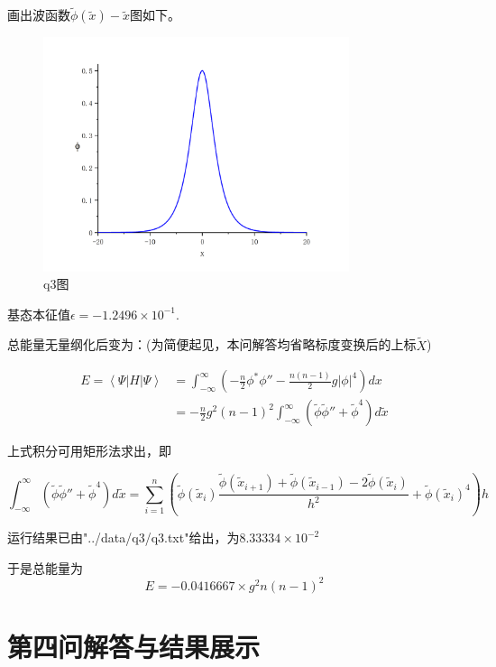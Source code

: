 \documentclass[10pt, a4paper]{article}
\begin{document}
    画出波函数$\tilde{\phi}(\tilde{x})-\tilde{x}$图如下。

    \begin{figure}[H]
        \centering
        \includegraphics[width=0.8\textwidth]{q3图.jpg}
        \caption{q3图}\label{fig:q3图}
    \end{figure}

    基态本征值$\epsilon=-1.2496\times10^{-1}$.

    总能量无量纲化后变为：(为简便起见，本问解答均省略标度变换后的上标$\tilde X$)

    \begin{align*}
      E=\left\langle \varPsi |H|\varPsi \right\rangle
      &=\int_{-\infty}^\infty(-\frac{n}{2}\phi^*\phi''-\frac{n(n-1)}{2}g|\phi|^4)dx\\
      &=-\frac{n}{2}g^2(n-1)^2\int_{-\infty}^\infty(\tilde{\phi}\tilde{\phi}''+\tilde{\phi}^4)d\tilde{x}
    \end{align*}

    上式积分可用矩形法求出，即

    \[\int_{-\infty}^\infty(\tilde{\phi}\tilde{\phi}''+\tilde{\phi}^4)d\tilde{x}=\sum_{i=1}^n(\tilde{\phi}(\tilde{x}_i)\frac{\tilde{\phi}(\tilde{x}_{i+1})+\tilde{\phi}(\tilde{x}_{i-1})-2\tilde{\phi}(\tilde{x}_i)}{h^2}+\tilde{\phi}(\tilde{x}_i)^4)h\]

    运行结果已由"../data/q3/q3.txt"给出，为$8.33334\times10^{-2}$

    于是总能量为
    \[E=-0.0416667\times g^2n(n-1)^2\]

    \section{第四问解答与结果展示}
\end{document}
